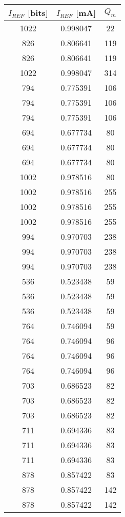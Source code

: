 \begin{tabular}{ccc}
\toprule
$I_{REF}$ [bits] & $I_{REF}$ [mA] & $Q_m$ \\
\midrule
            1022 &       0.998047 &    22 \\
             826 &       0.806641 &   119 \\
             826 &       0.806641 &   119 \\
            1022 &       0.998047 &   314 \\
             794 &       0.775391 &   106 \\
             794 &       0.775391 &   106 \\
             794 &       0.775391 &   106 \\
             694 &       0.677734 &    80 \\
             694 &       0.677734 &    80 \\
             694 &       0.677734 &    80 \\
            1002 &       0.978516 &    80 \\
            1002 &       0.978516 &   255 \\
            1002 &       0.978516 &   255 \\
            1002 &       0.978516 &   255 \\
             994 &       0.970703 &   238 \\
             994 &       0.970703 &   238 \\
             994 &       0.970703 &   238 \\
             536 &       0.523438 &    59 \\
             536 &       0.523438 &    59 \\
             536 &       0.523438 &    59 \\
             764 &       0.746094 &    59 \\
             764 &       0.746094 &    96 \\
             764 &       0.746094 &    96 \\
             764 &       0.746094 &    96 \\
             703 &       0.686523 &    82 \\
             703 &       0.686523 &    82 \\
             703 &       0.686523 &    82 \\
             711 &       0.694336 &    83 \\
             711 &       0.694336 &    83 \\
             711 &       0.694336 &    83 \\
             878 &       0.857422 &    83 \\
             878 &       0.857422 &   142 \\
             878 &       0.857422 &   142 \\
\bottomrule
\end{tabular}
